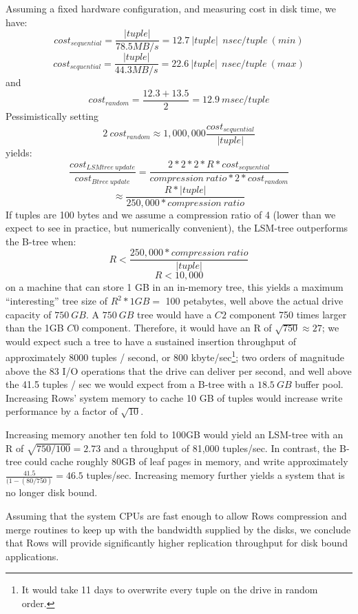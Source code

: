 \documentclass{sig-alternate-sigmod08}
\newcommand{\rows}{Rows\xspace}
\newcommand{\rowss}{Rows'\xspace}
\begin{document}
Assuming a fixed hardware configuration, and measuring cost in disk
time, we have:
\[
   cost_{sequential}=\frac{|tuple|}{78.5MB/s}=12.7~|tuple|~~nsec/tuple~(min)
\]
\[
   cost_{sequential}=\frac{|tuple|}{44.3MB/s}=22.6~|tuple|~~nsec/tuple~(max)
\]
and
\[
   cost_{random}=\frac{12.3+13.5}{2} = 12.9~msec/tuple
\]
Pessimistically setting
\[
2~cost_{random}\approx1,000,000\frac{cost_{sequential}}{|tuple|}
\] yields: \[
    \frac{cost_{LSMtree~update}}{cost_{Btree~update}}=\frac{2*2*2*R*cost_{sequential}}{compression~ratio*2*cost_{random}}
\]
\[
   \approx\frac{R*|tuple|}{250,000*compression~ratio}
\]
If tuples are 100 bytes and we assume a compression ratio of 4 (lower
than we expect to see in practice, but numerically convenient), the
LSM-tree outperforms the B-tree when:
\[
    R < \frac{250,000*compression~ratio}{|tuple|}
\]
\[
    R < 10,000
\]
on a machine that can store 1 GB in an in-memory tree, this yields a
maximum ``interesting'' tree size of $R^2*1GB = $ 100 petabytes, well
above the actual drive capacity of $750~GB$.  A $750~GB$ tree would
have a $C2$ component 750 times larger than the 1GB $C0$ component.
Therefore, it would have an R of $\sqrt{750}\approx27$; we would
expect such a tree to have a sustained insertion throughput of
approximately 8000 tuples / second, or 800 kbyte/sec\footnote{It would
  take 11 days to overwrite every tuple on the drive in random
  order.}; two orders of magnitude above the 83 I/O operations that
the drive can deliver per second, and well above the 41.5 tuples / sec
we would expect from a B-tree with a $18.5~GB$ buffer pool.
Increasing \rowss system memory to cache 10 GB of tuples would
increase write performance by a factor of $\sqrt{10}$.


Increasing memory another ten fold to 100GB would yield an LSM-tree
with an R of $\sqrt{750/100} = 2.73$ and a throughput of 81,000
tuples/sec.  In contrast, the B-tree could cache roughly 80GB of leaf pages
in memory, and write approximately $\frac{41.5}{(1-(80/750)} = 46.5$
tuples/sec.  Increasing memory further yields a system that
is no longer disk bound.

Assuming that the system CPUs are fast enough to allow \rows
compression and merge routines to keep up with the bandwidth supplied
by the disks, we conclude that \rows will provide significantly higher
replication throughput for disk bound applications.
\end{document}
